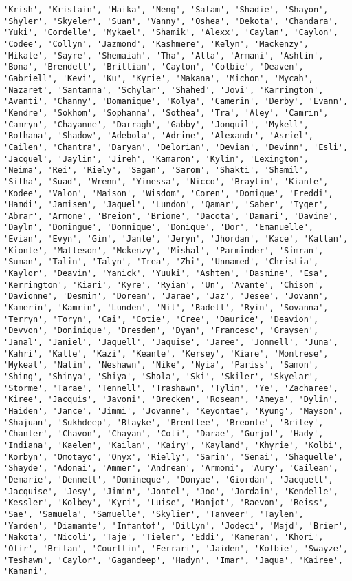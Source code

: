 \documentclass[11pt]{article}
\begin{document}
\begin{Verbatim}[commandchars=\\\{\}]
'Krish', 'Kristain', 'Maika', 'Neng', 'Salam', 'Shadie', 'Shayon', 'Shyler', 'Skyeler', 'Suan', 'Vanny', 'Oshea', 'Dekota', 'Chandara', 'Yuki', 'Cordelle', 'Mykael', 'Shamik', 'Alexx', 'Caylan', 'Caylon', 'Codee', 'Collyn', 'Jazmond', 'Kashmere', 'Kelyn', 'Mackenzy', 'Mikale', 'Sayre', 'Shemaiah', 'Tha', 'Alla', 'Armani', 'Ashtin', 'Bona', 'Brendell', 'Brittian', 'Cayton', 'Colbie', 'Deaven', 'Gabriell', 'Kevi', 'Ku', 'Kyrie', 'Makana', 'Michon', 'Mycah', 'Nazaret', 'Santanna', 'Schylar', 'Shahed', 'Jovi', 'Karrington', 'Avanti', 'Channy', 'Domanique', 'Kolya', 'Camerin', 'Derby', 'Evann', 'Kendre', 'Sokhom', 'Sophanna', 'Sothea', 'Tra', 'Aley', 'Camrin', 'Camryn', 'Chayanne', 'Darragh', 'Gabby', 'Jonquil', 'Mykell', 'Rothana', 'Shadow', 'Adebola', 'Adrine', 'Alexandr', 'Asriel', 'Cailen', 'Chantra', 'Daryan', 'Delorian', 'Devian', 'Devinn', 'Esli', 'Jacquel', 'Jaylin', 'Jireh', 'Kamaron', 'Kylin', 'Lexington', 'Neima', 'Rei', 'Riely', 'Sagan', 'Sarom', 'Shakti', 'Shamil', 'Sitha', 'Suad', 'Wrenn', 'Yinessa', 'Nicco', 'Braylin', 'Kiante', 'Kodee', 'Valon', 'Maison', 'Wisdom', 'Coren', 'Domique', 'Freddi', 'Hamdi', 'Jamisen', 'Jaquel', 'Lundon', 'Qamar', 'Saber', 'Tyger', 'Abrar', 'Armone', 'Breion', 'Brione', 'Dacota', 'Damari', 'Davine', 'Dayln', 'Domingue', 'Domnique', 'Donique', 'Dor', 'Emanuelle', 'Evian', 'Evyn', 'Gin', 'Jante', 'Jeryn', 'Jhordan', 'Kace', 'Kallan', 'Kionte', 'Matteson', 'Mckenzy', 'Mishal', 'Parminder', 'Simran', 'Suman', 'Talin', 'Talyn', 'Trea', 'Zhi', 'Unnamed', 'Christia', 'Kaylor', 'Deavin', 'Yanick', 'Yuuki', 'Ashten', 'Dasmine', 'Esa', 'Kerrington', 'Kiari', 'Kyre', 'Ryian', 'Un', 'Avante', 'Chisom', 'Davionne', 'Desmin', 'Dorean', 'Jarae', 'Jaz', 'Jesee', 'Jovann', 'Kamerin', 'Kamrin', 'Lunden', 'Nil', 'Radell', 'Ryin', 'Sovanna', 'Terryn', 'Toryn', 'Cai', 'Cotie', 'Cree', 'Daurice', 'Deavion', 'Devvon', 'Doninique', 'Dresden', 'Dyan', 'Francesc', 'Graysen', 'Janal', 'Janiel', 'Jaquell', 'Jaquise', 'Jaree', 'Jonnell', 'Juna', 'Kahri', 'Kalle', 'Kazi', 'Keante', 'Kersey', 'Kiare', 'Montrese', 'Mykeal', 'Nalin', 'Neshawn', 'Nike', 'Nyia', 'Pariss', 'Samon', 'Shing', 'Shinya', 'Shiya', 'Shola', 'Ski', 'Skiler', 'Skyelar', 'Storme', 'Tarae', 'Tennell', 'Trashawn', 'Tylin', 'Ye', 'Zacharee', 'Kiree', 'Jacquis', 'Javoni', 'Brecken', 'Rosean', 'Ameya', 'Dylin', 'Haiden', 'Jance', 'Jimmi', 'Jovanne', 'Keyontae', 'Kyung', 'Mayson', 'Shajuan', 'Sukhdeep', 'Blayke', 'Brentlee', 'Breonte', 'Briley', 'Chanler', 'Chavon', 'Chayan', 'Coti', 'Darae', 'Gurjot', 'Hady', 'Indiana', 'Kaelen', 'Kailan', 'Kairy', 'Kayland', 'Khyrie', 'Kolbi', 'Korbyn', 'Omotayo', 'Onyx', 'Rielly', 'Sarin', 'Senai', 'Shaquelle', 'Shayde', 'Adonai', 'Ammer', 'Andrean', 'Armoni', 'Aury', 'Cailean', 'Demarie', 'Dennell', 'Domineque', 'Donyae', 'Giordan', 'Jacquell', 'Jacquise', 'Jesy', 'Jimin', 'Jontel', 'Joo', 'Jordain', 'Kendelle', 'Kessler', 'Kolbey', 'Kyri', 'Luise', 'Manjot', 'Raevon', 'Reiss', 'Sae', 'Samuela', 'Samuelle', 'Skylier', 'Tanveer', 'Taylen', 'Yarden', 'Diamante', 'Infantof', 'Dillyn', 'Jodeci', 'Majd', 'Brier', 'Nakota', 'Nicoli', 'Taje', 'Tieler', 'Eddi', 'Kameran', 'Khori', 'Ofir', 'Britan', 'Courtlin', 'Ferrari', 'Jaiden', 'Kolbie', 'Swayze', 'Teshawn', 'Caylor', 'Gagandeep', 'Hadyn', 'Imar', 'Jaqua', 'Kairee', 'Kamani', 
\end{Verbatim}
\end{document}
